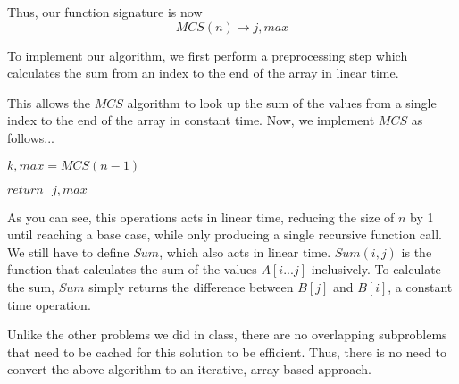 \documentclass[12pt]{article}
\begin{document}
Thus, our function signature is now
\[
MCS(n) \to j, max
\]

To implement our algorithm, we first perform a preprocessing step which calculates the sum from an index to the end of the array in linear time. \\

\begin{algorithm}[H]
\BlankLine

\end{algorithm}

This allows the $MCS$ algorithm to look up the sum of the values from a single index to the end of the array in constant time.
Now, we implement $MCS$ as follows... \\

\begin{algorithm}[H]
\BlankLine
	$k, max = MCS(n-1)$
	
	$return \text{ } j, max$
\end{algorithm}

As you can see, this operations acts in linear time, reducing the size of $n$ by 1 until reaching a base case, while only producing a single recursive function call. We still have to define $Sum$, which also acts in linear time. $Sum(i, j)$ is the function that calculates the sum of the values $A[i...j]$ inclusively. To calculate the sum, $Sum$ simply returns the difference between $B[j]$ and $B[i]$, a constant time operation.

Unlike the other problems we did in class, there are no overlapping subproblems that need to be cached for this solution to be efficient. Thus, there is no need to convert the above algorithm to an iterative, array based approach.
\end{document}
